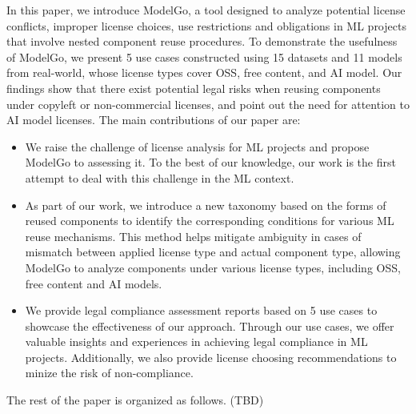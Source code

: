 In this paper, we introduce ModelGo, a tool designed to analyze potential license conflicts, improper license choices, use restrictions and obligations in ML projects that involve nested component reuse procedures.
To demonstrate the usefulness of ModelGo, we present 5 use cases constructed using 15 datasets and 11 models from real-world, whose license types cover OSS, free content, and AI model.
Our findings show that there exist potential legal risks when reusing  components under copyleft or non-commercial licenses, and point out the need for attention to AI model licenses.
The main contributions of our paper are:
\begin{itemize}
    \item We raise the challenge of license analysis for ML projects and propose ModelGo to assessing it. To the best of our knowledge, our work is the first attempt to deal with this challenge in the ML context.
    \item As part of our work, we introduce a new taxonomy based on the forms of reused components to identify the corresponding conditions for various ML reuse mechanisms. This method helps mitigate ambiguity in cases of mismatch between applied license type and actual component type, allowing ModelGo to analyze components under various license types, including OSS, free content and AI models.
    \item  We provide legal compliance assessment reports based on 5 use cases to showcase the effectiveness of our approach. 
    Through our use cases, we offer valuable insights and experiences in achieving legal compliance in ML projects. 
    Additionally, we also provide license choosing recommendations to minize the risk of non-compliance.
\end{itemize}

The rest of the paper is organized as follows. (TBD)


